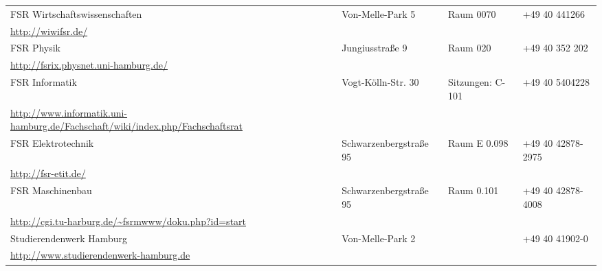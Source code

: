 \begin{tabularx}{\textwidth}{|X|X|X|X|}
\hline FSR Wirtschaftswissenschaften&Von-Melle-Park 5&Raum 0070&+49 40 441266\\
       \url{http://wiwifsr.de/}&&&\\ %
\hline FSR Physik&Jungiusstraße 9&Raum 020&+49 40 352 202\\
       \url{http://fsrix.physnet.uni-hamburg.de/}&&&\\ %
\hline FSR Informatik&Vogt-Kölln-Str. 30&Sitzungen: C-101&+49 40 5404228\\
       \url{http://www.informatik.uni-hamburg.de/Fachschaft/wiki/index.php/Fachschaftsrat}&&&\\ %
\hline FSR Elektrotechnik&Schwarzenbergstraße 95&Raum E 0.098&+49 40 42878-2975\\
       \url{http://fsr-etit.de/}&&&\\ %
\hline FSR Maschinenbau&Schwarzenbergstraße 95&Raum 0.101&+49 40 42878-4008\\
       \url{http://cgi.tu-harburg.de/~fsrmwww/doku.php?id=start}&&&\\ %
\hline Studierendenwerk Hamburg&Von-Melle-Park 2&&+49 40 41902-0\\
       \url{http://www.studierendenwerk-hamburg.de}&&&\\ %
\hline
\end{tabularx}
\clearpage
